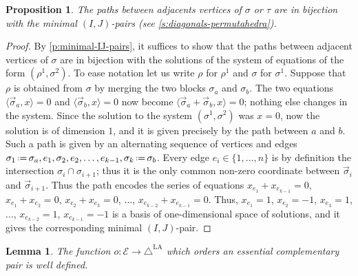 \documentclass{amsart}
\newtheorem{proposition}[theorem]{Proposition}
\newtheorem{lemma}[theorem]{Lemma}
\theoremstyle{definition}
\newcommand{\eqdef}{\mbox{\,\raisebox{0.2ex}{\scriptsize\ensuremath{\mathrm:}}\ensuremath{=}\,}} %
\newcommand{\LAD}{\triangle^{\mathrm{LA}}}
\newcommand{\EC}{\mathcal{E}} %
\begin{document}
\begin{proposition}
    \label{prop:geometrical-IJ}
    The paths between adjacents vertices of $\sigma$ or $\tau$ are in bijection with the minimal $(I,J)$-pairs (see \cref{s:diagonals-permutahedra}).
\end{proposition}

\begin{proof}
    By \cref{p:minimal-IJ-pairs}, it suffices to show that the paths between adjacent vertices of $\sigma$ are in bijection with the solutions of the system of equations of the form $(\rho^1,\sigma^2)$. 
    To ease notation let us write $\rho$ for $\rho^1$ and $\sigma$ for $\sigma^1$. 
    Suppose that $\rho$ is obtained from $\sigma$ by merging the two blocks $\sigma_a$ and $\sigma_b$. 
    The two equations $\langle \vec \sigma_a, x \rangle =0$ and $\langle \vec \sigma_b, x \rangle =0$ now become $\langle \vec \sigma_a + \vec \sigma_b, x \rangle =0$; nothing else changes in the system. 
    Since the solution to the system $(\sigma^1,\sigma^2)$ was $x=0$, now the solution is of dimension $1$, and it is given precisely by the path between $a$ and $b$.
    Such a path is given by an alternating sequence of vertices and edges $\sigma_1 \eqdef \sigma_a, e_1, \sigma_2, e_2, \ldots, e_{k-1}, \sigma_k \eqdef \sigma_b$. 
    Every edge $e_i \in \{1,\ldots, n\}$ is by definition the intersection $\sigma_{i} \cap \sigma_{i+1}$; thus it is the only common non-zero coordinate between $\vec \sigma_{i}$ and $\vec \sigma_{i+1}$.
    Thus the path encodes the series of equations $x_{e_1}+x_{e_{k-1}}=0$, $x_{e_1}+x_{e_2}=0$, $x_{e_2}+x_{e_3}=0$, $\ldots$, $x_{e_{k-2}}+x_{e_{k-1}}=0$. 
    Thus, $x_{e_1}=1$, $x_{e_2}=-1$, $x_{e_3}=1$, $\ldots$, $x_{e_{k-2}}=1$, $x_{e_{k-1}}=-1$ is a basis of one-dimensional space of solutions, and it gives the corresponding minimal $(I,J)$-pair. 
\end{proof}

\begin{lemma} 
\label{l:o-well-defined}
The function $o:\EC \to \LAD$ which orders an essential complementary pair is well defined.
\end{lemma}
\end{document}
